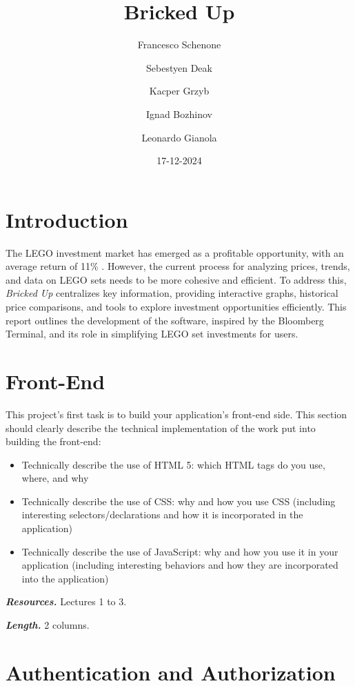 \documentclass[letterpaper,twocolumn]{article}
\title{Bricked Up}
\author{Francesco Schenone \and Sebestyen Deak \and Kacper Grzyb \and Ignad Bozhinov \and Leonardo Gianola}
\date{17-12-2024}
\newcommand{\myparagraph}[1]{\vspace{0.1cm}\noindent \textbf{\textit{#1.}}}
\begin{document}
\maketitle

\section{Introduction}

The LEGO investment market has emerged as a profitable opportunity, with an average return of 11\% \cite{lego_market}. However, the current process for analyzing prices, trends, and data on LEGO sets needs to be more cohesive and efficient.  
To address this, \textit{Bricked Up} centralizes key information, providing interactive graphs, historical price comparisons, and tools to explore investment opportunities efficiently. This report outlines the development of the software, inspired by the Bloomberg Terminal, and its role in simplifying LEGO set investments for users.


\section{Front-End}

This project's first task is to build your application's front-end side.
This section should clearly describe the technical implementation of the work put into building the front-end:

\begin{itemize}
    \item Technically describe the use of HTML 5: which HTML tags do you use, where, and why
    \item Technically describe the use of CSS: why and how you use CSS (including interesting selectors/declarations and how it is incorporated in the application)
    \item Technically describe the use of JavaScript: why and how you use it in your application (including interesting behaviors and how they are incorporated into the application)
\end{itemize}

\myparagraph{Resources} Lectures 1 to 3.

\myparagraph{Length} 2 columns.



\section{Authentication and Authorization}
\end{document}

